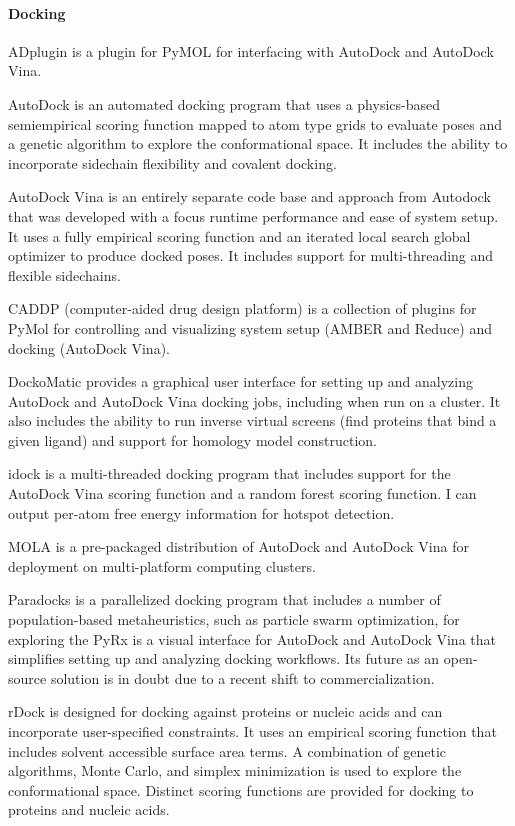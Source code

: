 \paragraph{Docking}

ADplugin is a plugin for PyMOL for interfacing with AutoDock and AutoDock Vina.

AutoDock \cite{Morris_2009} is an automated docking program that uses a physics-based semiempirical scoring function \cite{Huey_2007} mapped to atom type grids to evaluate poses and a genetic algorithm to explore the conformational space.  It includes the ability to incorporate sidechain flexibility and covalent docking.

AutoDock Vina \cite{Trott_2009} is an entirely separate code base and approach from Autodock that was developed with a focus runtime performance and ease of system setup. It uses a fully empirical scoring function and an iterated local search global optimizer to produce docked poses. It includes support for multi-threading and flexible sidechains.

CADDP (computer-aided drug design platform) \cite{Lill_2010} is a collection of plugins for PyMol for controlling and visualizing system setup (AMBER and Reduce) and docking (AutoDock Vina).

DockoMatic \cite{Bullock_2013}  provides a graphical user interface for setting up and analyzing AutoDock and AutoDock Vina docking jobs, including when run on a cluster. It also includes the ability to run inverse virtual screens (find proteins that bind a given ligand) and support for homology model construction.

idock \cite{Li_2012} is a multi-threaded docking program that includes support for the AutoDock Vina scoring function and a random forest scoring function. I can output per-atom free energy information for hotspot detection.

MOLA \cite{Abreu_2010} is a pre-packaged distribution of AutoDock and AutoDock Vina for deployment on multi-platform computing clusters.

Paradocks \cite{Meier_2010} is a parallelized docking program that includes a number of population-based metaheuristics, such as particle swarm optimization, for exploring the 
PyRx \cite{Dallakyan_2014} is a visual interface for AutoDock and AutoDock Vina that simplifies setting up and analyzing docking workflows.  Its future as an open-source solution is in doubt due to a recent shift to commercialization.

rDock \cite{Ruiz_Carmona_2014}  is designed for docking against proteins or nucleic acids and can incorporate user-specified constraints. It uses an empirical scoring function that includes solvent accessible surface area terms. A combination of genetic algorithms, Monte Carlo, and simplex minimization is used to explore the conformational space. Distinct scoring functions are provided for docking to proteins and nucleic acids.

